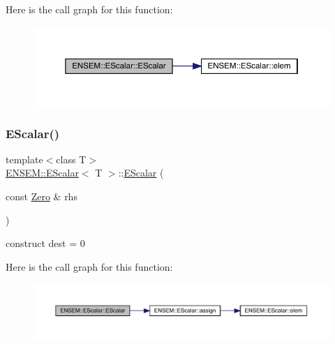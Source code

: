 Here is the call graph for this function\+:
\nopagebreak
\begin{figure}[H]
\begin{center}
\leavevmode
\includegraphics[width=350pt]{d0/d82/classENSEM_1_1EScalar_ad064adaa15e67106893182ba57c6fd91_cgraph}
\end{center}
\end{figure}
\mbox{\label{classENSEM_1_1EScalar_aa50915f887b0e206aecad55b2f25e4de}} 
\subsubsection{\texorpdfstring{EScalar()}{EScalar()}\hspace{0.1cm}{\footnotesize\ttfamily [3/12]}}
{\footnotesize\ttfamily template$<$class T$>$ \\
\mbox{\hyperlink{classENSEM_1_1EScalar}{E\+N\+S\+E\+M\+::\+E\+Scalar}}$<$ T $>$\+::\mbox{\hyperlink{classENSEM_1_1EScalar}{E\+Scalar}} (\begin{DoxyParamCaption}\item[{const \mbox{\hyperlink{structENSEM_1_1Zero}{Zero}} \&}]{rhs }\end{DoxyParamCaption})\hspace{0.3cm}{\ttfamily [inline]}}



construct dest = 0 

Here is the call graph for this function\+:
\nopagebreak
\begin{figure}[H]
\begin{center}
\leavevmode
\includegraphics[width=350pt]{d0/d82/classENSEM_1_1EScalar_aa50915f887b0e206aecad55b2f25e4de_cgraph}
\end{center}
\end{figure}
\mbox{\label{classENSEM_1_1EScalar_a62e800e98a28c98a6d297eb613e86f82}} 
